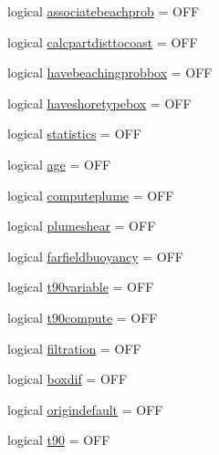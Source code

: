 \begin{DoxyCompactItemize}
\item 
logical \mbox{\hyperlink{structmodulelagrangianglobal_1_1t__state_ad1865b9935cacc641075ea747ae6cce3}{associatebeachprob}} = O\+FF
\item 
logical \mbox{\hyperlink{structmodulelagrangianglobal_1_1t__state_a5b83fc7ddd6441ea3d98453a2a8007e3}{calcpartdisttocoast}} = O\+FF
\item 
logical \mbox{\hyperlink{structmodulelagrangianglobal_1_1t__state_a101826da7614b62097d79d58ba608f05}{havebeachingprobbox}} = O\+FF
\item 
logical \mbox{\hyperlink{structmodulelagrangianglobal_1_1t__state_a9f9ed9fa9fca97f911b2f9867207f579}{haveshoretypebox}} = O\+FF
\item 
logical \mbox{\hyperlink{structmodulelagrangianglobal_1_1t__state_a23f9be49c47c54dfebbe1be20bd5eec6}{statistics}} = O\+FF
\item 
logical \mbox{\hyperlink{structmodulelagrangianglobal_1_1t__state_a87260da615c7ea8d5fdf97c06387c4d1}{age}} = O\+FF
\item 
logical \mbox{\hyperlink{structmodulelagrangianglobal_1_1t__state_ae4eb57adbe8405ec46fafc8831417d35}{computeplume}} = O\+FF
\item 
logical \mbox{\hyperlink{structmodulelagrangianglobal_1_1t__state_a501730dd460cec6e48588ca6bf4bca90}{plumeshear}} = O\+FF
\item 
logical \mbox{\hyperlink{structmodulelagrangianglobal_1_1t__state_aa2e04bc9209445f95aa71419611c6787}{farfieldbuoyancy}} = O\+FF
\item 
logical \mbox{\hyperlink{structmodulelagrangianglobal_1_1t__state_ae0d12859e8d484b080dea3a5a2d5d164}{t90variable}} = O\+FF
\item 
logical \mbox{\hyperlink{structmodulelagrangianglobal_1_1t__state_a6056251cda54bf40930563c9dce50176}{t90compute}} = O\+FF
\item 
logical \mbox{\hyperlink{structmodulelagrangianglobal_1_1t__state_a83ac1938749fb8a380e21eab80959aad}{filtration}} = O\+FF
\item 
logical \mbox{\hyperlink{structmodulelagrangianglobal_1_1t__state_a1f31f41604b7663691d2d29df6ffe49f}{boxdif}} = O\+FF
\item 
logical \mbox{\hyperlink{structmodulelagrangianglobal_1_1t__state_aa0471451a627214d61e1281c148e5b4d}{origindefault}} = O\+FF
\item 
logical \mbox{\hyperlink{structmodulelagrangianglobal_1_1t__state_a37b1e5f4140d19e9572e1cd8263c1ba2}{t90}} = O\+FF
\item 

\end{DoxyCompactItemize}

